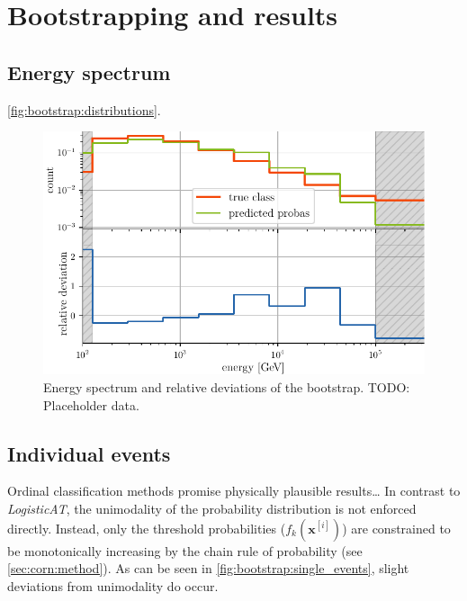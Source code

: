 \section{Bootstrapping and results}

\subsection{Energy spectrum}
\autoref{fig:bootstrap:distributions}.

\blindtext[2]

\begin{figure}
  \centering
  \includegraphics[scale=1]{content/plots/bootstrap:spectrum.pdf}
  \caption{
    Energy spectrum and relative deviations of the bootstrap.
    TODO: Placeholder data.
  }
  \label{fig:bootstrap:spectrum}
\end{figure}


\subsection{Individual events}
Ordinal classification methods promise physically plausible results… %
In contrast to \emph{LogisticAT},
  the unimodality of the probability distribution is not enforced directly.
Instead,
  only the threshold probabilities ($f_k(\mathbf{x}^{[i]})$) are constrained to be monotonically increasing
  by the chain rule of probability
  (see \autoref{sec:corn:method}).
As can be seen in \autoref{fig:bootstrap:single_events},
  slight deviations from unimodality do occur.


